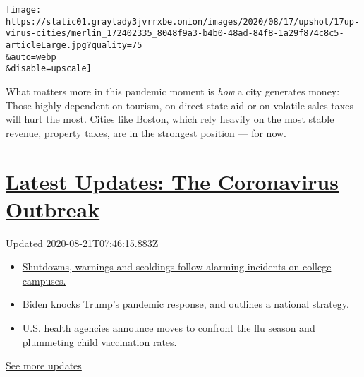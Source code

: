 \texttt{[image: https://static01.graylady3jvrrxbe.onion/images/2020/08/17/upshot/17up-virus-cities/merlin\_172402335\_8048f9a3-b4b0-48ad-84f8-1a29f874c8c5-articleLarge.jpg?quality=75\\\&auto=webp\\\&disable=upscale]}

What matters more in this pandemic moment is \emph{how} a city generates
money: Those highly dependent on tourism, on direct state aid or on
volatile sales taxes will hurt the most. Cities like Boston, which rely
heavily on the most stable revenue, property taxes, are in the strongest
position --- for now.

\hypertarget{latest-updates-the-coronavirus-outbreak}{%
\section{\texorpdfstring{\href{https://www.nytimes3xbfgragh.onion/2020/08/20/world/coronavirus-covid.html?action=click\&pgtype=Article\&state=default\&region=MAIN_CONTENT_1\&context=storylines_live_updates}{Latest
Updates: The Coronavirus
Outbreak}}{Latest Updates: The Coronavirus Outbreak}}\label{latest-updates-the-coronavirus-outbreak}}

Updated 2020-08-21T07:46:15.883Z

\begin{itemize}
\tightlist
\item
  \href{https://www.nytimes3xbfgragh.onion/2020/08/20/world/coronavirus-covid.html?action=click\&pgtype=Article\&state=default\&region=MAIN_CONTENT_1\&context=storylines_live_updates\#link-68774d88}{Shutdowns,
  warnings and scoldings follow alarming incidents on college campuses.}
\item
  \href{https://www.nytimes3xbfgragh.onion/2020/08/20/world/coronavirus-covid.html?action=click\&pgtype=Article\&state=default\&region=MAIN_CONTENT_1\&context=storylines_live_updates\#link-26b58724}{Biden
  knocks Trump's pandemic response, and outlines a national strategy.}
\item
  \href{https://www.nytimes3xbfgragh.onion/2020/08/20/world/coronavirus-covid.html?action=click\&pgtype=Article\&state=default\&region=MAIN_CONTENT_1\&context=storylines_live_updates\#link-4e542da3}{U.S.
  health agencies announce moves to confront the flu season and
  plummeting child vaccination rates.}
\end{itemize}

\href{https://www.nytimes3xbfgragh.onion/2020/08/20/world/coronavirus-covid.html?action=click\&pgtype=Article\&state=default\&region=MAIN_CONTENT_1\&context=storylines_live_updates}{See
more updates}

